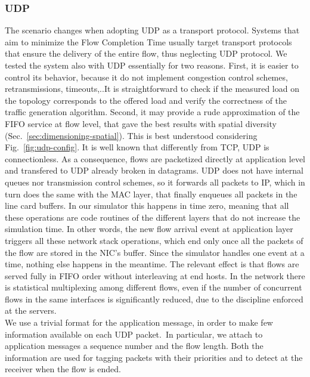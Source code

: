 \subsubsection{UDP}
\label{sec:udp-setup}
The scenario changes when adopting UDP as a transport protocol. Systems that aim to minimize the Flow Completion Time usually target transport protocols that ensure the delivery of the entire flow, thus neglecting UDP protocol. We tested the system also with UDP essentially for two reasons. First, it is easier to control its behavior, because it do not implement congestion control schemes, retransmissions, timeouts,..It is straightforward to check if the measured load on the topology corresponds to the offered load and verify the correctness of the traffic generation algorithm. Second, it may provide a rude approximation of the FIFO service at flow level, that gave the best results with spatial diversity (Sec.~\ref{sec:dimensioning-spatial}). This is best understood considering Fig.~\ref{fig:udp-config}. It is well known that differently from TCP, UDP is connectionless. As a consequence, flows are packetized directly at application level and transfered to UDP already broken in datagrams. UDP does not have internal queues nor transmission control schemes, so it forwards all packets to IP, which in turn does the same with the MAC layer, that finally enqueues all packets in the line card buffers. In our simulator this happens in time zero, meaning that all these operations are code routines of the different layers that do not increase the simulation time. In other words, the new flow arrival event at application layer triggers all these network stack operations, which end only once all the packets of the flow are stored in the NIC's buffer. Since the simulator handles one event at a time, nothing else happens in the meantime. The relevant effect is that flows are served fully in FIFO order without interleaving at end hosts. In the network there is statistical multiplexing among different flows, even if the number of concurrent flows in the same interfaces is significantly reduced, due to the discipline enforced at the servers.\\
We use a trivial format for the application message, in order to make few information available on each UDP packet. In particular, we attach to application messages a sequence number and the flow length. Both the information are used for tagging packets with their priorities and to detect at the receiver when the flow is ended.
